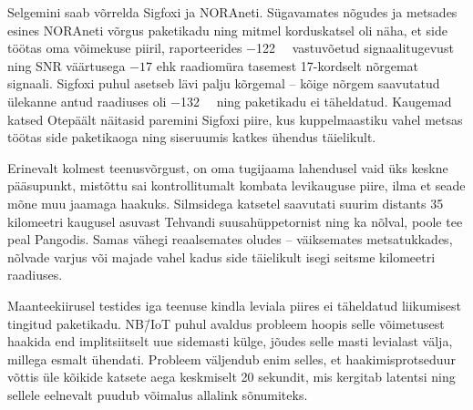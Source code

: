 \documentclass[12pt]{article}
\begin{document}
    Selgemini saab võrrelda Sigfoxi ja NORAneti.
    Sügavamates nõgudes ja metsades esines NORAneti võrgus paketikadu ning mitmel korduskatsel oli näha, et side töötas oma võimekuse piiril, raporteerides \SI{-122}{\deci\belm} vastuvõetud signaalitugevust ning SNR väärtusega $-17$ ehk raadiomüra tasemest 17-kordselt nõrgemat signaali.
    Sigfoxi puhul asetseb lävi palju kõrgemal -- kõige nõrgem saavutatud ülekanne antud raadiuses oli \SI{-132}{\deci\belm} ning paketikadu ei täheldatud.
    Kaugemad katsed Otepäält näitasid paremini Sigfoxi piire, kus kuppelmaastiku vahel metsas töötas side paketikaoga ning siseruumis katkes ühendus täielikult.

    Erinevalt kolmest teenusvõrgust, on oma tugijaama lahendusel vaid üks keskne pääsupunkt, mistõttu sai kontrollitumalt kombata levikauguse piire, ilma et seade mõne muu jaamaga haakuks.
    Silmsidega katsetel saavutati suurim distants 35 kilomeetri kaugusel asuvast Tehvandi suusahüppetornist ning ka nõlval, poole tee peal Pangodis.
    Samas vähegi reaalsemates oludes -- väiksemates metsatukkades, nõlvade varjus või majade vahel kadus side täielikult isegi seitsme kilomeetri raadiuses.

    Maanteekiirusel testides iga teenuse kindla leviala piires ei täheldatud liikumisest tingitud paketikadu.
    NB\=/IoT puhul avaldus probleem hoopis selle võimetusest haakida end implitsiitselt uue sidemasti külge, jõudes selle masti levialast välja, millega esmalt ühendati.
    Probleem väljendub enim selles, et haakimisprotseduur võttis üle kõikide katsete aega keskmiselt 20 sekundit, mis kergitab latentsi ning sellele eelnevalt puudub võimalus allalink sõnumiteks.
\end{document}

